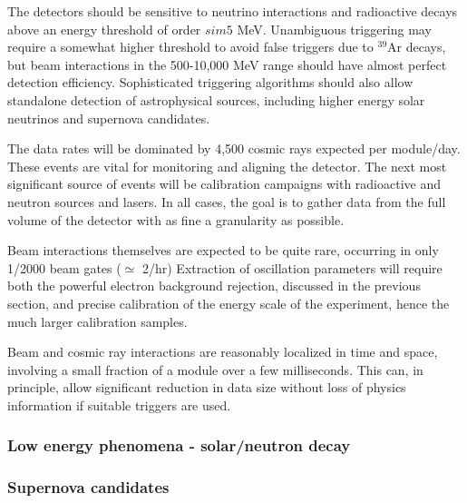 \documentclass[../main-v1.tex]{subfiles}
\begin{document}
The detectors should be sensitive to neutrino interactions and radioactive decays above an energy threshold of order $sim 5$ MeV.  Unambiguous triggering may require a somewhat higher threshold  to avoid false triggers due to $^{39}$Ar decays,  but beam interactions in the 500-10,000 MeV range should have almost perfect detection efficiency. Sophisticated triggering algorithms should also allow standalone detection of astrophysical sources, including higher energy solar neutrinos and supernova candidates. 

The data rates will be dominated by 4,500 cosmic rays expected per module/day.  These events are vital for monitoring and aligning the detector.  The next most significant source of events will be calibration campaigns with radioactive and neutron sources and lasers.  In all cases, the goal is to gather data from the full volume of the detector with as fine a granularity as possible. 

Beam interactions themselves are expected to be quite rare, occurring in only 1/2000 beam gates ($\simeq$ 2/hr)  Extraction of oscillation parameters will require both the powerful electron background rejection, discussed in the previous section,  and precise calibration of the energy scale of the experiment, hence the much larger calibration samples.

Beam and cosmic ray interactions are reasonably localized in time and space, involving a small fraction of a module over a few milliseconds.  This can, in principle, allow significant reduction in data size without loss of physics information if suitable triggers are used.

\subsubsection{Low energy phenomena - solar/neutron decay } 

\subsubsection{Supernova candidates }\label{sec:supernova}
\end{document}
